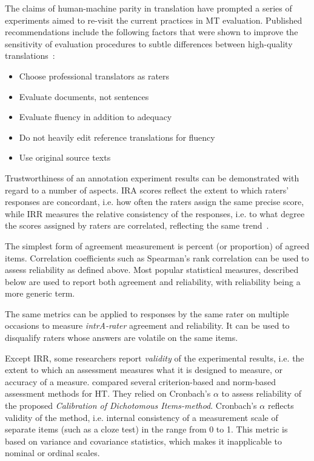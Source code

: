 The claims of human-machine parity in translation have prompted a series of experiments aimed to re-visit the current practices in MT evaluation. Published recommendations include the following factors that were shown to improve the sensitivity of evaluation procedures to subtle differences between high-quality translations~\cite{Laubli2020}:

\begin{itemize}\compresslist{}
	\item Choose professional translators as raters
	\item Evaluate documents, not sentences
	\item Evaluate fluency in addition to adequacy
	\item Do not heavily edit reference translations for fluency
	\item Use original source texts
\end{itemize}

Trustworthiness of an annotation experiment results can be demonstrated with regard to a number of aspects. 
\gls{IRA} scores reflect the extent to which raters' responses are concordant, i.e. how often the raters assign the same precise score, while \gls{IRR} measures the relative consistency of the responses, i.e. to what degree the scores assigned by raters are correlated, reflecting the same trend~\cite{Gisev2013}.

The simplest form of agreement measurement is percent (or proportion) of agreed items. Correlation coefficients such as Spearman's rank correlation can be used to assess reliability as defined above.
Most popular statistical measures, described below are used to report both agreement and reliability, with reliability being a more generic term.

The same metrics can be applied to responses by the same rater on multiple occasions to measure \textit{intrA-rater} agreement and reliability. It can be used to disqualify raters whose answers are volatile on the same items.

Except IRR, some researchers report \textit{validity} of the experimental results, i.e. the extent to which an assessment measures what it is designed to measure, or accuracy of a measure. \citet{Eyckmans2009} compared several criterion-based and norm-based assessment methods for HT. They relied on Cronbach's $\alpha$ to assess reliability of the proposed \textit{Calibration of Dichotomous Items-method}. Cronbach's $\alpha$ reflects validity of the method, i.e. internal consistency of a measurement scale of separate items (such as a cloze test) in the range from 0 to 1. This metric is based on variance and covariance statistics, which makes it inapplicable to nominal or ordinal scales. 

